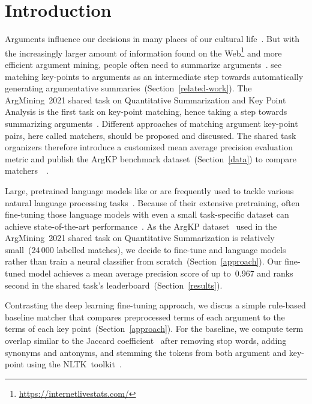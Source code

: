 \section{Introduction}\label{introduction}

Arguments influence our decisions in many places of our cultural life~\cite{Bar-HaimEFKLS2020}.
But with the increasingly larger amount of information found on the Web\footnote{\url{https://internetlivestats.com/}} and more efficient argument mining, people often need to summarize arguments~\cite{LawrenceR2019,Bar-HaimEFKLS2020}.
\citet{Bar-HaimEFKLS2020} see matching key-points to arguments as an intermediate step towards automatically generating argumentative summaries~(Section~\ref{related-work}).
The ArgMining~2021 shared task on Quantitative Summarization and Key Point Analysis is the first task on key-point matching, hence taking a step towards summarizing arguments~\todocite.
Different approaches of matching argument key-point pairs, here called matchers, should be proposed and discussed.
The shared task organizers therefore introduce a customized mean average precision evaluation metric and publish the ArgKP benchmark dataset~(Section~\ref{data}) to compare matchers~\todocite~\cite{Bar-HaimEFKLS2020}.

Large, pretrained language models like \Bert or \Roberta are frequently used to tackle various natural language processing tasks~\cite{DevlinCLT2019,LiuOGDJCLLZS2019}. 
Because of their extensive pretraining, often fine-tuning those language models with even a small task-specific dataset can achieve state-of-the-art performance~\todocite.
As the ArgKP dataset~\cite{Bar-HaimEFKLS2020} used in the ArgMining~2021 shared task on Quantitative Summarization is relatively small~(24\,000 labelled matches), we decide to fine-tune \Bert and \Roberta language models rather than train a neural classifier from scratch~(Section~\ref{approach}).
Our fine-tuned \RobertaBase model achieves a mean average precision score of up to~0.967 and ranks second in the shared task's leaderboard~(Section~\ref{results}).

Contrasting the deep learning fine-tuning approach, we discus a simple rule-based baseline matcher that compares preprocessed terms of each argument to the terms of each key point~(Section~\ref{approach}). For the baseline, we compute term overlap similar to the Jaccard coefficient~\cite{Jaccard1902} after removing stop words, adding synonyms and antonyms, and stemming the tokens from both argument and key-point using the NLTK~toolkit~\cite{BirdL2004}.